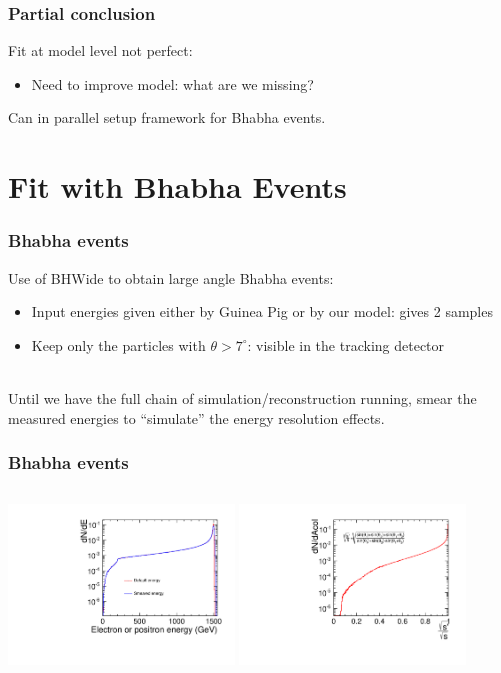 \documentclass{beamer}
\begin{document}
\begin{frame}
\frametitle{Partial conclusion}
Fit at model level not perfect:
\begin{itemize}
  \item Need to improve model: what are we missing?
\end{itemize} 
Can in parallel setup framework for Bhabha events.
\end{frame}

\section{Fit with Bhabha Events}
\begin{frame}
\frametitle{Bhabha events}
Use of BHWide to obtain large angle Bhabha events:
\begin{itemize}
  \item Input energies given either by Guinea Pig or by our model: gives 2
  samples
  \item Keep only the particles with $\theta>7^\circ$: visible in the
  tracking detector
\end{itemize}
~\\
Until we have the full chain of simulation/reconstruction running, smear the
measured energies to ``simulate'' the energy resolution effects.
\end{frame}
\begin{frame}
\frametitle{Bhabha events}
\begin{columns}[c]
\column{6cm}
\includegraphics[width=6cm]{ElectronEnergyFCAL.pdf}
\column{6cm}
\includegraphics[width=6cm]{AccolinearityFCAL.pdf}
\end{columns}
\end{frame}
\end{document}
